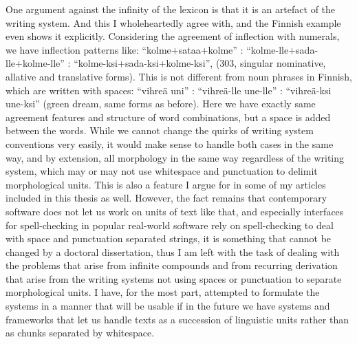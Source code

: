 \documentclass[officiallayout,final]{unihelcompling}
\begin{document}
One argument against the infinity of the lexicon is that it is an artefact of
the writing system. And this I wholeheartedly agree with, and the Finnish
example even shows it explicitly. Considering the agreement of inflection with
numerals, we have inflection patterns like: ``kolme+sataa+kolme'' :
``kolme-lle+sada-lle+kolme-lle'' : ``kolme-ksi+sada-ksi+kolme-ksi'', (303,
singular nominative, allative and translative forms). This is not different
from noun phrases in Finnish, which are written with spaces: ``vihreä uni'' :
``vihreä-lle une-lle'' : ``vihreä-ksi une-ksi'' (green dream, same forms as
before). Here we have exactly same agreement features and structure of word
combinations, but a space is added between the words.  While we cannot change
the quirks of writing system conventions very easily, it would make sense to
handle both cases in the same way, and by extension, all morphology in the same
way regardless of the writing system, which may or may not use whitespace and
punctuation to delimit morphological units.  This is also a feature I argue for
in some of my articles included in this thesis as well.  However, the fact
remains that contemporary software does not let us work on units of text like
that, and especially interfaces for spell-checking in popular real-world
software rely on spell-checking to deal with space and punctuation separated
strings, it is something that cannot be changed by a doctoral dissertation,
thus I am left with the task of dealing with the problems that arise from
infinite compounds and from recurring derivation that arise from the writing
systems not using spaces or punctuation to separate morphological units. I
have, for the most part, attempted to formulate the systems in a manner that
will be usable if in the future we have systems and frameworks that let us
handle texts as a succession of linguistic units rather than as chunks
separated by whitespace.
\end{document}

